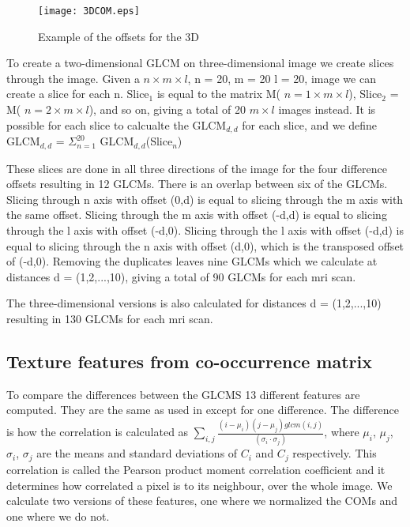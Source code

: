 \begin{figure}[H]
  \centering
  \texttt{[image: 3DCOM.eps]}
  \caption{Example of the offsets for the 3D}\label{3DCOM}
\end{figure}



To create a two-dimensional GLCM on three-dimensional image we create slices through the image. Given a $n \times m \times l$, n = 20, m = 20 l = 20, image we can create a slice for each n. Slice$_1$ is equal to the matrix M( $n = 1 \times m \times l$), Slice$_2$ = M( $n = 2 \times m \times l$), and so on, giving a total of 20 $m \times l$ images instead. It is possible for each slice to calcualte the GLCM$_{d,d}$ for each slice, and we define GLCM$_{d,d}$ = $ \Sigma_{n=1}^20$ GLCM$_{d,d}$(Slice$_n$)

These slices are done in all three directions of the image for the four difference offsets resulting in 12 GLCMs. There is an overlap between six of the GLCMs. Slicing through n axis with offset (0,d) is equal to slicing through the m axis with the same offset. Slicing through the m axis with offset (-d,d) is equal to slicing through the l axis with offset (-d,0). Slicing through the l axis with offset (-d,d) is equal to slicing through the n axis with offset (d,0), which is the transposed offset of (-d,0). Removing the duplicates leaves nine GLCMs which we calculate at distances d = (1,2,...,10), giving a total of 90 GLCMs for each mri scan.

The three-dimensional versions is also calculated for distances d = (1,2,...,10) resulting in 130 GLCMs for each mri scan.

\subsection{Texture features from co-occurrence matrix}
To compare the differences between the GLCMS 13 different features are computed. They are the same as used in \cite{MRfreeborough} except for one difference. The difference is how the correlation is calculated as $\sum_{i,j} \frac{(i-\mu_i)(j-\mu_j)glcm(i,j)}{(\sigma_i \cdot \sigma_j)}$, where $\mu_i$, $\mu_j$, $\sigma_i$, $\sigma_j$ are the means and standard deviations of $C_i$ and $C_j$ respectively. This correlation is called the Pearson product moment correlation coefficient and it determines how correlated a pixel is to its neighbour, over the whole image\cite{graycoprops}\cite{Pearson}. We calculate two versions of these features, one where we normalized the COMs and one where we do not.


